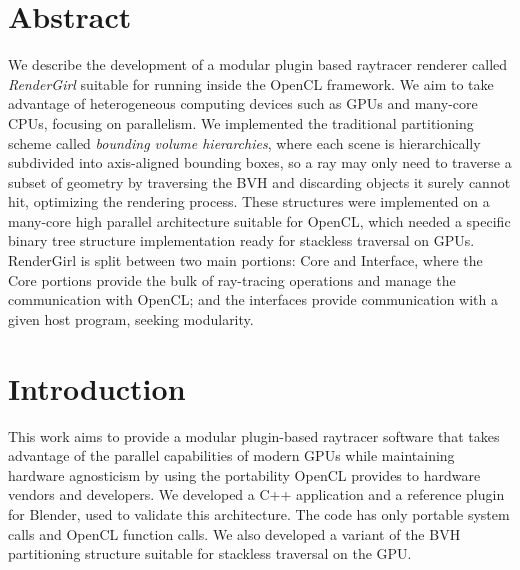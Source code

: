 \documentclass[a0,portrait]{a0poster}
\begin{document}
\begin{multicols}{2} %



\color{Navy} %

\section*{Abstract}

We describe the development of a modular plugin based raytracer
renderer called \emph{RenderGirl} suitable for running inside the
OpenCL framework. We aim to take advantage of heterogeneous computing
devices such as GPUs and many-core CPUs, focusing on parallelism. We
implemented the traditional partitioning scheme called \emph{bounding
  volume hierarchies}, where each scene is hierarchically subdivided
into axis-aligned bounding boxes, so a ray may only need to traverse a
subset of geometry by traversing the BVH and discarding objects it
surely cannot hit, optimizing the rendering process. These structures
were implemented on a many-core high parallel architecture suitable
for OpenCL, which needed a specific binary tree structure
implementation ready for stackless traversal on GPUs. RenderGirl is
split between two main portions: Core and Interface, where the Core
portions provide the bulk of ray-tracing operations and manage the
communication with OpenCL; and the interfaces provide communication
with a given host program, seeking modularity.


\color{Black} %
\normalsize
\section*{Introduction}

This work aims to provide a modular plugin-based raytracer software
that takes advantage of the parallel capabilities of modern GPUs while
maintaining hardware agnosticism by using the portability OpenCL
provides to hardware vendors and developers. We developed a C++
application and a reference plugin for Blender, used to validate this
architecture. The code has only portable system calls and OpenCL
function calls. We also developed a variant of the BVH partitioning
structure suitable for stackless traversal on the GPU.


\end{multicols}
\end{document}
